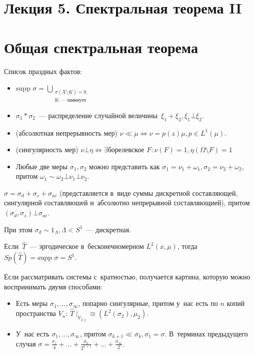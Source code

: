 \documentclass{article}
\begin{document}
\section*{Лекция 5. Спектральная теорема II}
\resetcntrs

\section{Общая спектральная теорема}

Список праздных фактов:
\begin{itemize}
	\item $\text{supp }\sigma = \bigcup\limits_{\substack{ \sigma(X
		\setminus K) = 0,\\\text{K~--- замкнуто}}}$
	\item $\sigma_1 \ast \sigma_2$~--- распределение случайной величины~$\xi_1 +
		\xi_2, \xi_1 \bot \xi_2$.
	\item (абсолютная непрерывность мер) $\nu \ll \mu \Leftrightarrow \nu = p(z)
		\mu, p \in L^1(\mu)$.
	\item (сингулярность мер) $\nu \bot \eta \Leftrightarrow \exists $борелевское
		$F: \nu(F) = 1, \eta(\Omega \setminus F) = 1$
	\item Любые две меры $\sigma_1, \sigma_2$ можно представить как $\sigma_1 =
		\nu_1 + \omega_1, \sigma_2 = \nu_2 + \omega_2$, притом $\omega_1 \sim
		\omega_2 \bot \nu_1 \bot \nu_2$.
\end{itemize}

\begin{theorem}
	$\sigma = \sigma_d + \sigma_s + \sigma_{ac}$ (представляется
	в~виде суммы дискретной составляющей, сингулярной составляюшей и~абсолютно
	непрерывной составляющией), притом $(\sigma_d, \sigma_s) \bot \sigma_{ac}$.

	При этом $\sigma_d \sim 1_\Lambda, \Lambda < S^1$~--- дискретная.
\end{theorem}

\begin{theorem}[$\ast$]
	Если~$\hat T$~--- эргодическое в~бесконечномерном $L^2(x, \mu)$, тогда
	$Sp(\hat T) = \text{supp }\sigma = S^1$.
\end{theorem}

Если рассматривать системы с~кратностью, получается картина, которую можно
воспринимать двумя способами:
\begin{itemize}
	\item Есть меры $\sigma_1, \ldots, \sigma_{\infty}$, попарно сингулярные,
		притом у~нас есть по $n$ копий пространства $V_n$: $\hat T\mid_{V_{2,j}}
		\cong (L^2(\sigma_2), \mu_2)$.
	\item У~нас есть $\sigma_1, \ldots, \sigma_{\infty}$, притом $\sigma_{k+1} \ll
		\sigma_k, \sigma_1 = \sigma$. В~терминах предыдущего случая $\sigma =
		\frac{\sigma_1}{4} + \ldots + \frac{\sigma_k}{2^{k+1}} + \ldots +
		\frac{\sigma_\infty}{2}$.
\end{itemize}
\end{document}
